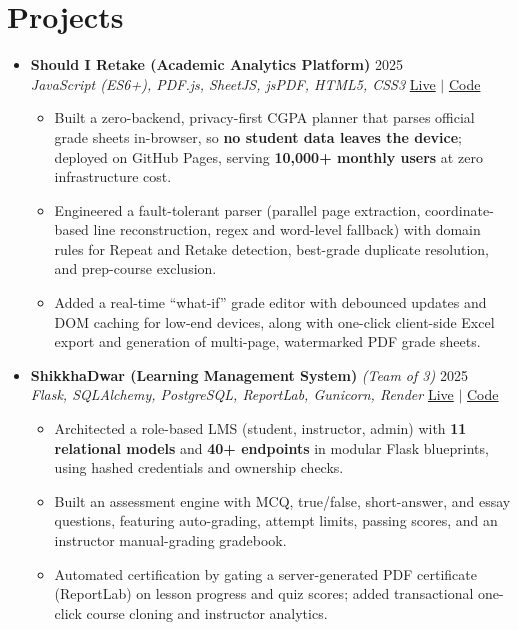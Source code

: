 \documentclass[a4paper,11pt]{article}
\newcommand{\resumeItem}[1]{
  \item\small{
    {#1 \vspace{-2pt}}
  }
}
\newcommand{\resumeItemListStart}{\begin{itemize}}
\newcommand{\resumeItemListEnd}{\end{itemize}\vspace{-5pt}}
\begin{document}
\section{Projects}
  \begin{itemize}[leftmargin=0.15in, label={}, itemsep=6pt]

    \item
    \textbf{Should I Retake (Academic Analytics Platform)} \hfill 2025\\
    \small\textit{JavaScript (ES6+), PDF.js, SheetJS, jsPDF, HTML5, CSS3} \hfill
    \href{https://badhon495.github.io/should-i-retake/}{Live} $|$
    \href{https://github.com/badhon495/should-i-retake}{Code}
    \vspace{-5pt}
    \resumeItemListStart
      \resumeItem{Built a zero-backend, privacy-first CGPA planner that parses official grade sheets in-browser, so \textbf{no student data leaves the device}; deployed on GitHub Pages, serving \textbf{10,000+ monthly users} at zero infrastructure cost.}
      \resumeItem{Engineered a fault-tolerant parser (parallel page extraction, coordinate-based line reconstruction, regex and word-level fallback) with domain rules for Repeat and Retake detection, best-grade duplicate resolution, and prep-course exclusion.}
      \resumeItem{Added a real-time ``what-if'' grade editor with debounced updates and DOM caching for low-end devices, along with one-click client-side Excel export and generation of multi-page, watermarked PDF grade sheets.}
    \resumeItemListEnd

    \item
    \textbf{ShikkhaDwar (Learning Management System)} \textit{\small (Team of 3)} \hfill 2025\\
    \small\textit{Flask, SQLAlchemy, PostgreSQL, ReportLab, Gunicorn, Render} \hfill
    \href{https://shikkhadwar-81r2.onrender.com/}{Live} $|$
    \href{https://github.com/nihal-kabir/ShikkhaDwar}{Code}
    \vspace{-5pt}
    \resumeItemListStart
      \resumeItem{Architected a role-based LMS (student, instructor, admin) with \textbf{11 relational models} and \textbf{40+ endpoints} in modular Flask blueprints, using hashed credentials and ownership checks.}
      \resumeItem{Built an assessment engine with MCQ, true/false, short-answer, and essay questions, featuring auto-grading, attempt limits, passing scores, and an instructor manual-grading gradebook.}
      \resumeItem{Automated certification by gating a server-generated PDF certificate (ReportLab) on lesson progress and quiz scores; added transactional one-click course cloning and instructor analytics.}
    \resumeItemListEnd


\end{itemize}
\end{document}
